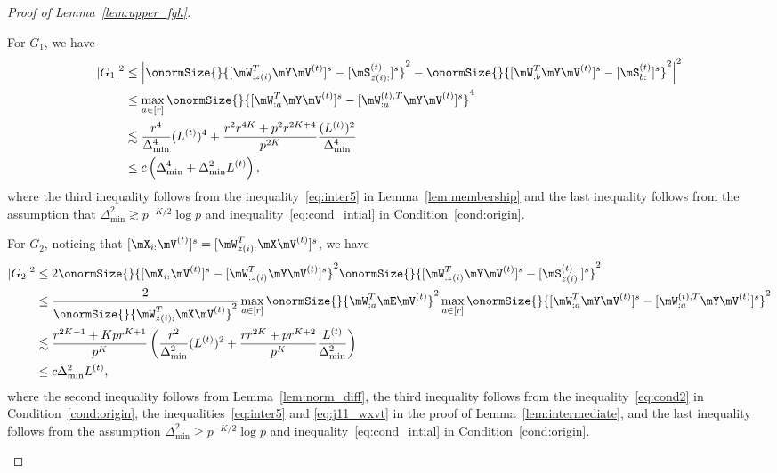 \documentclass[lettersize,onecolumn,journal]{IEEEtran}
\theoremstyle{definition}
\theoremstyle{definition}
\newcommand{\of}[1]{\left(#1\right)}
\newcommand{\aabs}[1]{\left|#1\right|}
\begin{document}
\begin{proof}[Proof of Lemma~\ref{lem:upper_fgh}]
\begin{enumerate}[wide]
    For $G_1$, we have 
    \begin{align}
        |G_1|^2 &\leq \aabs{ \onormSize{}{ [ \mW_{:z(i)}^T \mY \mV^{(t)} ]^s - [ \mS_{z(i):}^{(t)}  ]^s}^2 - \onormSize{}{ [ \mW_{:b}^T \mY \mV^{(t)} ]^s -  [ \mS_{b:}^{(t)}  ]^s }^2 }^2 \\
        & \leq \max_{a \in [r]} \onormSize{}{ [ \mW_{:a}^T \mY \mV^{(t)} ]^s - [ \mW_{:a}^{(t),T} \mY \mV^{(t)}  ]^s}^4\\
        & \lesssim \frac{r^4}{\Delta_{\min}^4} (L^{(t)})^4 +  \frac{r^2 r^{4K} + p^2r^{2K+4}}{p^{2K}} \frac{(L^{(t)})^2}{\Delta_{\min}^4} \\
        & \leq c\of{\Delta_{\min}^4 +  \Delta_{\min}^2 L^{(t)}}, \label{eq:g1}
    \end{align}
    where the third inequality follows from the inequality~\eqref{eq:inter5} in Lemma~\ref{lem:membership} and the last inequality follows from the assumption that $\Delta_{\min}^2 \gtrsim p^{-K/2}\log p$ and inequality~\eqref{eq:cond_intial} in Condition~\ref{cond:origin}.
    
    For $G_2$, noticing that $[\mX_{i:} \mV^{(t)}]^s = [ \mW_{z(i):}^T\mX \mV^{(t)}]^s$, we have 
    \begin{align}
        |G_2|^2 &\leq 2\onormSize{}{ [\mX_{i:} \mV^{(t)}]^s  -  [  \mW_{:z(i)}^T \mY \mV^{(t)} ]^s}^2 \onormSize{}{ [  \mW_{:z(i)}^T \mY \mV^{(t)} ]^s -  [  \mS_{z(i):}^{(t)}  ]^s }^2 \\
        & \leq \frac{2}{ \onormSize{}{ \mW_{z(i):}^T\mX \mV^{(t)}}^2} \max_{a \in [r]}\onormSize{}{ \mW_{:a}^T \mE \mV^{(t)} }^2 \max_{a \in [r]} \onormSize{}{ [  \mW_{:a}^T \mY \mV^{(t)} ]^s -  [   \mW_{:a}^{(t),T} \mY \mV^{(t)}  ]^s}^2\\
        & \lesssim \frac{ r^{2K-1} + K p r^{K+1} }{p^{K}} \of{ \frac{r^2}{\Delta_{\min}^2} (L^{(t)})^2 + \frac{r r^{2K} + pr^{K+2}}{p^{K}} \frac{L^{(t)}}{\Delta_{\min}^2} }\\
        & \leq c \Delta_{\min}^2 L^{(t)},\label{eq:g2}
    \end{align}
    where the second inequality follows from Lemma~\ref{lem:norm_diff}, the third inequality follows from the inequality~\eqref{eq:cond2} in Condition~\ref{cond:origin}, the inequalities~\eqref{eq:inter5} and \eqref{eq:j11_wxvt} in the proof of Lemma~\ref{lem:intermediate},  and the last inequality follows from the assumption $\Delta_{\min}^2 \geq p^{-K/2} \log p$ and inequality~\eqref{eq:cond_intial} in Condition~\ref{cond:origin}.
    

\end{enumerate}
\end{proof}
\end{document}
